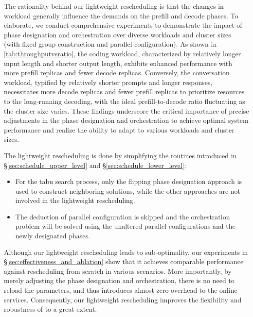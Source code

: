 The rationality behind our lightweight rescheduling is that the changes in workload generally influence the demands on the prefill and decode phases. To elaborate, we conduct comprehensive experiments to demonstrate the impact of phase designation and orchestration over diverse workloads and cluster sizes (with fixed group construction and parallel configuration). 
As shown in \autoref{tab:throughputvsratio}, the coding workload, characterized by relatively longer input length and shorter output length, exhibits enhanced performance with more prefill replicas and fewer decode replicas. Conversely, the conversation workload, typified by relatively shorter prompts and longer responses, necessitates more decode replicas and fewer prefill replicas to prioritize resources to the long-running decoding, with the ideal prefill-to-decode ratio fluctuating as the cluster size varies. 
These findings underscore the critical importance of precise adjustments in the phase designation and orchestration to achieve optimal system performance and realize the ability to adapt to various workloads and cluster sizes.

The lightweight rescheduling is done by simplifying the routines introduced in \S\ref{sec:schedule_upper_level} and \S\ref{sec:schedule_lower_level}: 
% 
\begin{itemize}[topsep=0pt, leftmargin=*]
\item For the tabu search process, only the flipping phase designation approach is used to construct neighboring solutions, while the other approaches are not involved in the lightweight rescheduling.
\item The deduction of parallel configuration is skipped and the orchestration problem will be solved using the unaltered parallel configurations and the newly designated phases.
\end{itemize}
% 
Although our lightweight rescheduling leads to sub-optimality, our experiments in \S\ref{sec:effectiveness_and_ablation} show that it achieves comparable performance against rescheduling from scratch in various scenarios. More importantly, by merely adjusting the phase designation and orchestration, there is no need to reload the parameters, and thus introduces almost zero overhead to the online services. Consequently, our lightweight rescheduling improves the flexibility and robustness of \sys to a great extent.